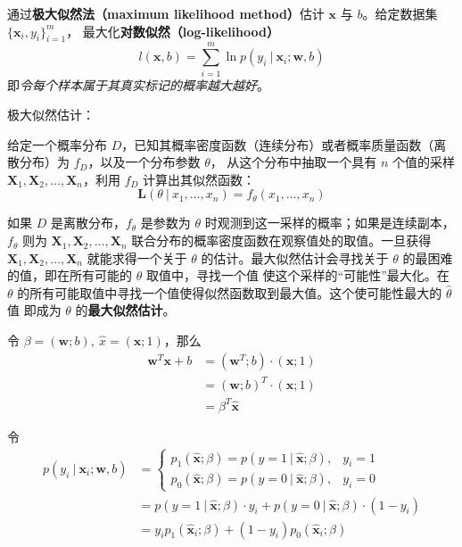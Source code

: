 \documentclass[../studies-ml.tex]{subfiles}
\begin{document}
通过\textbf{极大似然法（maximum likelihood method）}估计 $\pmb{x}$ 与 $b$。给定数据集 $\{\pmb{x}_i,y_i\}_{i=1}^m$，
最大化\textbf{对数似然（log-likelihood）}
\begin{equation}
  l(\pmb{x},b) = \sum_{i=1}^{m}\ln p(y_i\ |\ \pmb{x}_i;\pmb{w}, b)
\end{equation}
即\textit{令每个样本属于其真实标记的概率越大越好}。

\begin{anote}
  极大似然估计：

  给定一个概率分布 $D$，已知其概率密度函数（连续分布）或者概率质量函数（离散分布）为 $f_D$，以及一个分布参数 $\theta$，
  从这个分布中抽取一个具有 $n$ 个值的采样 $\pmb{X}_1,\pmb{X}_2,\dots,\pmb{X}_n$，利用 $f_D$ 计算出其似然函数：
  \begin{equation*}
    \pmb{L}(\theta\ |\ x_1,\dots,x_n) = f_{\theta}(x_1,\dots,x_n)
  \end{equation*}

  如果 $D$ 是离散分布，$f_{\theta}$ 是参数为 $\theta$ 时观测到这一采样的概率；如果是连续副本，$f_{\theta}$ 则为
  $\pmb{X}_1,\pmb{X}_2,\dots,\pmb{X}_n$ 联合分布的概率密度函数在观察值处的取值。一旦获得 $\pmb{X}_1,\pmb{X}_2,\dots,\pmb{X}_n$
  就能求得一个关于 $\theta$ 的估计。最大似然估计会寻找关于 $\theta$ 的最困难的值，即在所有可能的 $\theta$ 取值中，寻找一个值
  使这个采样的“可能性”最大化。在 $\theta$ 的所有可能取值中寻找一个值使得似然函数取到最大值。这个使可能性最大的 $\hat{\theta}$ 值
  即成为 $\theta$ 的\textbf{最大似然估计}。
\end{anote}

令 $\beta = (\pmb{w};b),\ \hat{x} = (\pmb{x};1)$，那么
\begin{equation*}
  \begin{split}
    \pmb{w}^T\pmb{x} + b & = (\pmb{w}^T;b) \cdot (\pmb{x};1) \\
    & = (\pmb{w};b)^T \cdot (\pmb{x};1) \\
    & = \beta^T\hat{\pmb{x}}
  \end{split}
\end{equation*}

令
\begin{equation}
  \begin{split}
    p(y_i\ |\ \pmb{x}_i;\pmb{w},b) & =
    \begin{cases}
      p_1(\hat{\pmb{x}};\beta) = p(y=1\ |\ \hat{\pmb{x}};\beta), & y_i = 1 \\
      p_0(\hat{\pmb{x}};\beta) = p(y=0\ |\ \hat{\pmb{x}};\beta), & y_i = 0
    \end{cases} \\
    & = p(y = 1\ |\ \hat{\pmb{x}};\beta) \cdot y_i + p(y=0\ |\ \hat{\pmb{x}};\beta) \cdot (1-y_i) \\
    & = y_i p_1(\hat{\pmb{x}}_i;\beta) + (1-y_i) p_0(\hat{\pmb{x}}_i;\beta)
  \end{split}
\end{equation}
\end{document}
